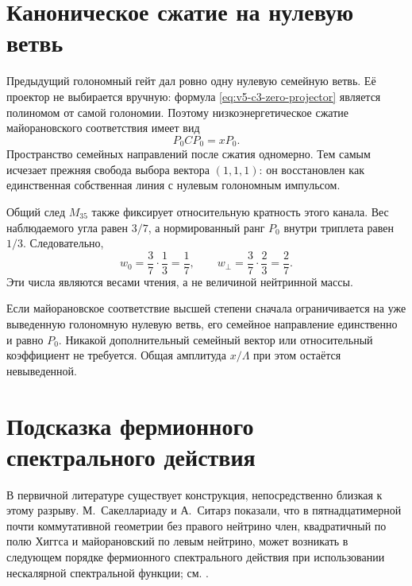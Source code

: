 \section{Каноническое сжатие на нулевую ветвь}

Предыдущий голономный гейт дал ровно одну нулевую семейную ветвь. Её
проектор не выбирается вручную: формула \eqref{eq:v5-c3-zero-projector}
является полиномом от самой голономии. Поэтому низкоэнергетическое сжатие
майорановского соответствия имеет вид
\begin{equation}
 P_0 C P_0=xP_0.
 \label{eq:v5-zero-compressed-majorana}
\end{equation}
Пространство семейных направлений после сжатия одномерно. Тем самым
исчезает прежняя свобода выбора вектора $(1,1,1)$: он восстановлен как
единственная собственная линия с нулевым голономным импульсом.

Общий след $M_{35}$ также фиксирует относительную кратность этого канала.
Вес наблюдаемого угла равен $3/7$, а нормированный ранг $P_0$ внутри
триплета равен $1/3$. Следовательно,
\begin{equation}
 w_0=\frac37\cdot\frac13=\frac17,
 \qquad
 w_\perp=\frac37\cdot\frac23=\frac27.
 \label{eq:v5-h15-zero-line-weight}
\end{equation}
Эти числа являются весами чтения, а не величиной нейтринной массы.

\begin{proposition}
Если майорановское соответствие высшей степени сначала ограничивается на
уже выведенную голономную нулевую ветвь, его семейное направление
единственно и равно $P_0$. Никакой дополнительный семейный вектор или
относительный коэффициент не требуется. Общая амплитуда $x/\Lambda$ при
этом остаётся невыведенной.
\end{proposition}

\section{Подсказка фермионного спектрального действия}

В первичной литературе существует конструкция, непосредственно близкая к
этому разрыву. М.~Сакеллариаду и А.~Ситарз показали, что в
пятнадцатимерной почти коммутативной геометрии без правого нейтрино член,
квадратичный по полю Хиггса и майорановский по левым нейтрино, может
возникать в следующем порядке фермионного спектрального действия при
использовании нескалярной спектральной функции; см.
.


